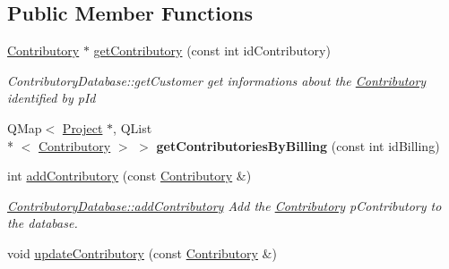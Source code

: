 \subsection*{Public Member Functions}
\begin{DoxyCompactItemize}
\item 
\hyperlink{classContributory}{Contributory} $\ast$ \hyperlink{classContributoryDatabase_aaf643ec778cd00b78a26b30c1a280f17}{get\+Contributory} (const int id\+Contributory)
\begin{DoxyCompactList}\small\item\em Contributory\+Database\+::get\+Customer get informations about the \hyperlink{classContributory}{Contributory} identified by {\itshape p\+Id} \end{DoxyCompactList}\item 
\hypertarget{classContributoryDatabase_a61c8d9041e5a3f57ea121ad51b616f12}{Q\+Map$<$ \hyperlink{classProject}{Project} $\ast$, Q\+List\\*
$<$ \hyperlink{classContributory}{Contributory} $>$ $>$ {\bfseries get\+Contributories\+By\+Billing} (const int id\+Billing)}\label{classContributoryDatabase_a61c8d9041e5a3f57ea121ad51b616f12}

\item 
int \hyperlink{classContributoryDatabase_a73b0f14afd67a50203b843e68486b900}{add\+Contributory} (const \hyperlink{classContributory}{Contributory} \&)
\begin{DoxyCompactList}\small\item\em \hyperlink{classContributoryDatabase_a73b0f14afd67a50203b843e68486b900}{Contributory\+Database\+::add\+Contributory} Add the \hyperlink{classContributory}{Contributory} {\itshape p\+Contributory} to the database. \end{DoxyCompactList}\item 
\hypertarget{classContributoryDatabase_aba607055e86a809096714f1a28a60dce}{void \hyperlink{classContributoryDatabase_aba607055e86a809096714f1a28a60dce}{update\+Contributory} (const \hyperlink{classContributory}{Contributory} \&)}\label{classContributoryDatabase_aba607055e86a809096714f1a28a60dce}


\end{DoxyCompactItemize}
